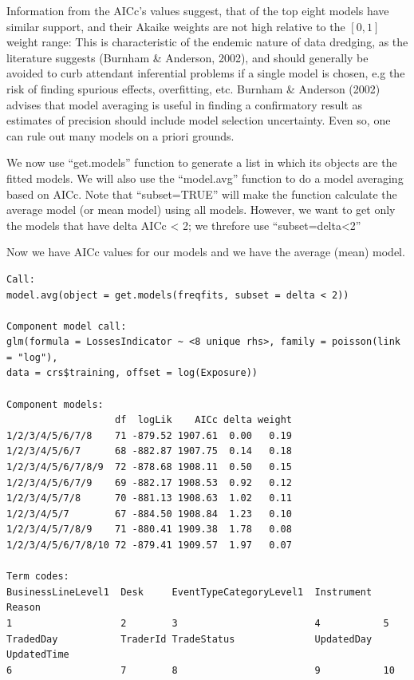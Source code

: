 \documentclass{DissertateUSU}
\begin{document}
Information from the AICc's values suggest, that of the top eight models
have similar support, and their Akaike weights are not high relative to
the \([0,1]\) weight range: This is characteristic of the endemic nature
of data dredging, as the literature suggests (Burnham \& Anderson,
2002), and should generally be avoided to curb attendant inferential
problems if a single model is chosen, e.g the risk of finding spurious
effects, overfitting, etc. Burnham \& Anderson (2002) advises that model
averaging is useful in finding a confirmatory result as estimates of
precision should include model selection uncertainty. Even so, one can
rule out many models on a priori grounds.\medskip    

We now use ``get.models'' function to generate a list in which its
objects are the fitted models. We will also use the ``model.avg''
function to do a model averaging based on AICc. Note that
``subset=TRUE'' will make the function calculate the average model (or
mean model) using all models. However, we want to get only the models
that have delta AICc \textless{} 2; we threfore use
``subset=delta\textless{}2''

\singlespacing

\doublespacing

Now we have AICc values for our models and we have the average (mean)
model.\medskip

\singlespacing
\begin{verbatim}
Call:
model.avg(object = get.models(freqfits, subset = delta < 2))

Component model call: 
glm(formula = LossesIndicator ~ <8 unique rhs>, family = poisson(link = "log"),
data = crs$training, offset = log(Exposure))

Component models: 
                   df  logLik    AICc delta weight
1/2/3/4/5/6/7/8    71 -879.52 1907.61  0.00   0.19
1/2/3/4/5/6/7      68 -882.87 1907.75  0.14   0.18
1/2/3/4/5/6/7/8/9  72 -878.68 1908.11  0.50   0.15
1/2/3/4/5/6/7/9    69 -882.17 1908.53  0.92   0.12
1/2/3/4/5/7/8      70 -881.13 1908.63  1.02   0.11
1/2/3/4/5/7        67 -884.50 1908.84  1.23   0.10
1/2/3/4/5/7/8/9    71 -880.41 1909.38  1.78   0.08
1/2/3/4/5/6/7/8/10 72 -879.41 1909.57  1.97   0.07

Term codes: 
BusinessLineLevel1  Desk     EventTypeCategoryLevel1  Instrument  Reason 
1                   2        3                        4           5 
TradedDay           TraderId TradeStatus              UpdatedDay  UpdatedTime 
6                   7        8                        9           10 
\end{verbatim}
\doublespacing
\end{document}
